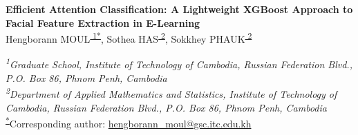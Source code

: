 \vspace{0.1in}
\begin{center}
  {\fontsize{14}{22}\selectfont\textbf{Efficient Attention Classification: A Lightweight XGBoost Approach to Facial Feature Extraction in E-Learning}}\\[9pt]

  {\fontsize{12}{22}
    Hengborann MOUL\textsuperscript{\color{superscript}\hyperlink{aff1}{\color{superscript} 1*}},\;
    Sothea HAS\textsuperscript{\color{superscript}\hyperlink{aff2}{\color{superscript} 2}},\;
    Sokkhey PHAUK\textsuperscript{\color{superscript}\hyperlink{aff2}{\color{superscript} 2}}\\[6pt]
  }

  \textit{
    \textsuperscript{\hypertarget{aff1}{\color{superscript}1}}Graduate School, Institute of Technology of Cambodia, Russian Federation Blvd., P.O. Box 86, Phnom Penh, Cambodia
  }\\[7pt]
  \textit{
    \textsuperscript{\hypertarget{aff2}{\color{superscript}2}}Department of Applied Mathematics and Statistics, Institute of Technology of Cambodia, Russian Federation Blvd., P.O. Box 86, Phnom Penh, Cambodia
  }\\[7pt]

  {\textsuperscript{\color{superscript}\hyperlink{aff1}{\color{superscript} *}}Corresponding author: \href{mailto:hengborann_moul@gsc.itc.edu.kh}{%
    \textcolor{povteal}{hengborann\_moul@gsc.itc.edu.kh}%
  }}
\end{center}

\vspace{5pt}

